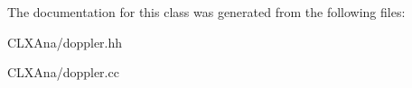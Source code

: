 The documentation for this class was generated from the following files\+:\begin{DoxyCompactItemize}
\item 
C\+L\+X\+Ana/doppler.\+hh\item 
C\+L\+X\+Ana/doppler.\+cc\end{DoxyCompactItemize}
